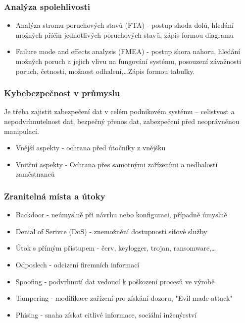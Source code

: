 \subsubsection*{Analýza spolehlivosti}
\begin{itemize}
    \item Analýza stromu poruchových stavů (FTA) - postup shoda dolů, hledání možných příčin jednotlivých poruchových stavů, zápis formou diagramu
    \item Failure mode and effects analysis (FMEA) - postup shora nahoru, hledání možných poruch a jejich vlivu na fungování systému, posouzení závažnosti poruch, četnosti, možnost odhalení,\dots Zápis formou tabulky.
\end{itemize}

\subsubsection*{Kybebezpečnost v průmyslu}
Je třeba zajistit zabezpečení dat v celém podnikovém systému – celistvost a nepodvrhnutelnost dat, bezpečný přenos dat, zabezpečení před neoprávněnou manipulací.
\begin{itemize}
    \item Vnější aspekty - ochrana před útočníky z vnějšku
    \item Vnitřní aspekty - Ochrana přes samotnými zařízeními a nedbalostí zaměstnanců
\end{itemize}

\subsubsection*{Zranitelná místa a útoky}
\begin{itemize}
    \item Backdoor - neúmyslně při návrhu nebo konfiguraci, případně úmyslně
    \item Denial of Serivce (DoS) - znemožnění dostupnosti síťové služby
    \item Útok s přímým přístupem - červ, keylogger, trojan, ransomware,\dots
    \item Odposlech - odcizení firemních informací
    \item Spoofing - podvrhnutí dat vedoucí k poškození procesů ve výrobě
    \item Tampering - modifikace zařízení pro získání dozoru, "Evil made attack"
    \item Phising - snaha získat citlivé informace, sociální inženýrství
\end{itemize}

